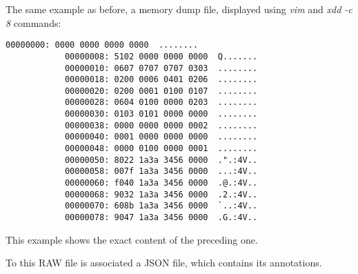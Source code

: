     \begin{minipage}{\dimexpr\linewidth-20pt}
        The same example as before, a memory dump file, displayed using \textit{vim} and \textit{xdd -c 8} commands:

        \begin{lstlisting}[style=hexdump, caption={8 bytes per line visualization of a Hex Dump from \textit{Training/basic/V\_7\_8\_P1/16/5070-1643978841-heap.raw}}, label={lst:hexdump-8bytes}]
            00000000: 0000 0000 0000 0000  ........
            00000008: 5102 0000 0000 0000  Q.......
            00000010: 0607 0707 0707 0303  ........
            00000018: 0200 0006 0401 0206  ........
            00000020: 0200 0001 0100 0107  ........
            00000028: 0604 0100 0000 0203  ........
            00000030: 0103 0101 0000 0000  ........
            00000038: 0000 0000 0000 0002  ........
            00000040: 0001 0000 0000 0000  ........
            00000048: 0000 0100 0000 0001  ........
            00000050: 8022 1a3a 3456 0000  .".:4V..
            00000058: 007f 1a3a 3456 0000  ...:4V..
            00000060: f040 1a3a 3456 0000  .@.:4V..
            00000068: 9032 1a3a 3456 0000  .2.:4V..
            00000070: 608b 1a3a 3456 0000  `..:4V..
            00000078: 9047 1a3a 3456 0000  .G.:4V..
        \end{lstlisting}
    \end{minipage}

    This example shows the exact content of the preceding one. 

    To this RAW file is associated a JSON file, which contains its annotations.  

